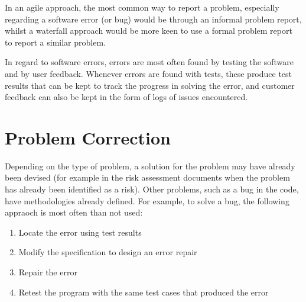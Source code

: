 In an agile approach, the most common way to report a problem, especially regarding a software error (or bug) would be through an informal problem report, whilst a waterfall approach would be more keen to use a formal problem report to report a similar problem.

In regard to software errors, errors are most often found by testing the software and by user feedback. Whenever errors are found with tests, these produce test results that can be kept to track the progress in solving the error, and customer feedback can also be kept in the form of logs of issues encountered.

\section{Problem Correction}
Depending on the type of problem, a solution for the problem may have already been devised (for example in the risk assessment documents when the problem has already been identified as a risk). Other problems, such as a bug in the code, have methodologies already defined. For example, to solve a bug, the following appraoch is most often than not used:
\begin{enumerate}
    \item Locate the error using test results
    \item Modify the specification to design an error repair
    \item Repair the error
    \item Retest the program with the same test cases that produced the error
\end{enumerate}